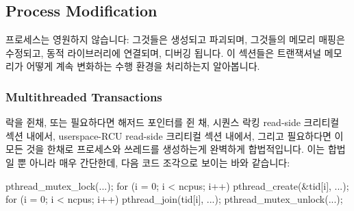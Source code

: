 \subsection{Process Modification}
\label{sec:future:Process Modification}

프로세스는 영원하지 않습니다:
그것들은 생성되고 파괴되며, 그것들의 메모리 매핑은 수정되고, 동적 라이브러리에
연결되며, 디버깅 됩니다.
이 섹션들은 트랜잭셔널 메모리가 어떻게 계속 변화하는 수행 환경을 처리하는지
알아봅니다.

\subsubsection{Multithreaded Transactions}
\label{sec:future:Multithreaded Transactions}

락을 쥔채, 또는 필요하다면 해저드 포인터를 쥔 채, 시퀀스 락킹 read-side
크리티컬 섹션 내에서, userspace-RCU read-side 크리티컬 섹션 내에서, 그리고
필요하다면 이 모든 것을 한채로 프로세스와 쓰레드를 생성하는게 완벽하게
합법적입니다.
이는 합법일 뿐 아니라 매우 간단한데, 다음 코드 조각으로 보이는 바와 같습니다:

\begin{VerbatimN}
pthread_mutex_lock(...);
for (i = 0; i < ncpus; i++)
	pthread_create(&tid[i], ...);
for (i = 0; i < ncpus; i++)
	pthread_join(tid[i], ...);
pthread_mutex_unlock(...);
\end{VerbatimN}

